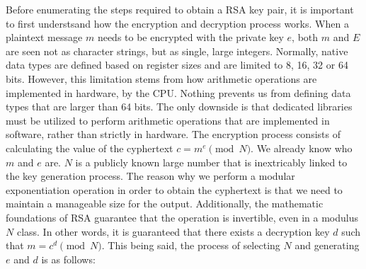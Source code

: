 Before enumerating the steps required to obtain a RSA key pair, it is important
to first understsand how the encryption and decryption process works. When a
plaintext message $m$ needs to be encrypted with the private key $e$, both $m$
and $E$ are seen not as character strings, but as single, large integers.
Normally, native data types are defined based on register sizes and are limited
to 8, 16, 32 or 64 bits. However, this limitation stems from how arithmetic
operations are implemented in hardware, by the CPU. Nothing prevents us from
defining data types that are larger than 64 bits. The only downside is that
dedicated libraries must be utilized to perform arithmetic operations that are
implemented in software, rather than strictly in hardware. The encryption
process consists of calculating the value of the cyphertext $c = m^e \pmod{N}$.
We already know who $m$ and $e$ are. $N$ is a publicly known large number that
is inextricably linked to the key generation process. The reason why we perform
a modular exponentiation operation in order to obtain the cyphertext is that
we need to maintain a manageable size for the output. Additionally, the
mathematic foundations of RSA guarantee that the operation is invertible, even
in a modulus $N$ class. In other words, it is guaranteed that there exists a
decryption key $d$ such that $m = c^d \pmod{N}$. This being said, the process of
selecting $N$ and generating $e$ and $d$ is as follows:

